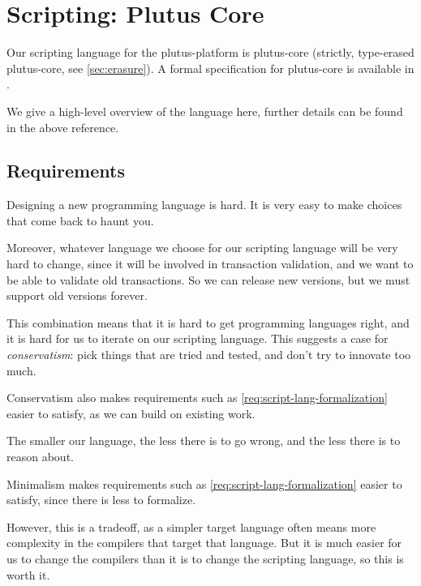 \documentclass[plutus.tex]{subfiles}
\begin{document}
\section{Scripting: Plutus Core}
\label{sec:plutus-core}


Our scripting language for the \gls{plutus-platform} is \gls{plutus-core} (strictly, type-erased \gls{plutus-core}, see \cref{sec:erasure}).
A formal specification for \gls{plutus-core} is available in \textcite{plutus-core-spec}.

We give a high-level overview of the language here, further details can be found in the above reference.

\subsection{Requirements}
\begin{requirement}
\label{req:script-lang-conservatism}
Designing a new programming language is hard.
It is very easy to make choices that come back to haunt you.

Moreover, whatever language we choose for our scripting language will be very hard to change, since it will be involved in transaction validation, and we want to be able to validate old transactions.
So we can release new versions, but we must support old versions forever.

This combination means that it is hard to get programming languages right, and it is hard for us to iterate on our scripting language.
This suggests a case for \emph{conservatism}: pick things that are tried and tested, and don't try to innovate too much.

Conservatism also makes requirements such as \cref{req:script-lang-formalization} easier to satisfy, as we can build on existing work.
\end{requirement}

\begin{requirement}[Minimalism]
\label{req:script-lang-minimalism}
The smaller our language, the less there is to go wrong, and the less there is to reason about.

Minimalism makes requirements such as \cref{req:script-lang-formalization} easier to satisfy, since there is less to formalize.

However, this is a tradeoff, as a simpler target language often means more complexity in the compilers that target that language.
But it is much easier for us to change the compilers than it is to change the scripting language, so this is worth it.
\end{requirement}
\end{document}
